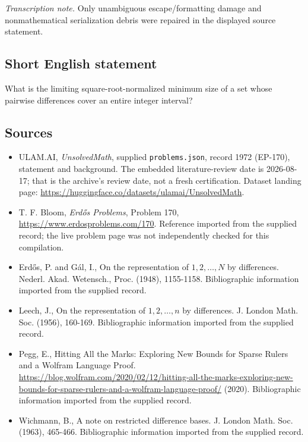 \documentclass[11pt,a4paper]{article}
\begin{document}
{\small\emph{Transcription note.} Only unambiguous escape/formatting damage and nonmathematical serialization debris were repaired in the displayed source statement.}

\subsection{Short English statement}

What is the limiting square-root-normalized minimum size of a set whose pairwise differences cover an entire integer interval?

\subsection{Sources}

{\small

\begin{itemize}

\item[\hypertarget{source:1972:1}{S1}] ULAM.AI, \emph{UnsolvedMath}, supplied \texttt{problems.json}, record 1972 (EP-170), statement and background. The embedded literature-review date is 2026-08-17; that is the archive’s review date, not a fresh certification. Dataset landing page: \url{https://huggingface.co/datasets/ulamai/UnsolvedMath}.

\item[\hypertarget{source:1972:2}{S2}] T. F. Bloom, \emph{Erdős Problems}, Problem 170, \url{https://www.erdosproblems.com/170}. Reference imported from the supplied record; the live problem page was not independently checked for this compilation.

\item[\hypertarget{source:1972:3}{S3}] Erd\H{o}s, P. and G\'{a}l, I., On the representation of $1,2,\ldots,N$ by differences. Nederl. Akad. Wetensch., Proc. (1948), 1155-1158. Bibliographic information imported from the supplied record.

\item[\hypertarget{source:1972:4}{S4}] Leech, J., On the representation of $1,2,\ldots,n$ by differences. J. London Math. Soc. (1956), 160-169. Bibliographic information imported from the supplied record.

\item[\hypertarget{source:1972:5}{S5}] Pegg, E., Hitting All the Marks: Exploring New Bounds for Sparse Rulers and a Wolfram Language Proof. \url{https://blog.wolfram.com/2020/02/12/hitting-all-the-marks-exploring-new-bounds-for-sparse-rulers-and-a-wolfram-language-proof/} (2020). Bibliographic information imported from the supplied record.

\item[\hypertarget{source:1972:6}{S6}] Wichmann, B., A note on restricted difference bases. J. London Math. Soc. (1963), 465-466. Bibliographic information imported from the supplied record.

\end{itemize}

}

\label{end:1972}
\end{document}
